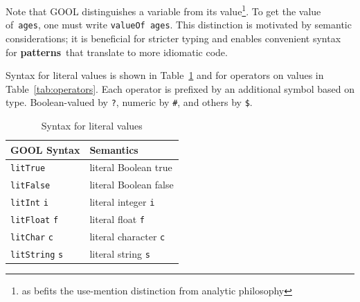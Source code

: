 \documentclass[sigplan,review,anonymous,prologue,dvipsnames]{acmart}
\newcommand{\abbrev}[1]{\textbf{#1}}
\newcommand{\oopatterns}{\abbrev{patterns}}
\begin{document}
Note that GOOL distinguishes a variable from its value\footnote{
as befits the use-mention distinction from analytic philosophy}. To get
the value of~\verb|ages|, one must write \verb|valueOf ages|. This distinction 
is motivated by semantic considerations; it is beneficial for stricter typing 
and enables convenient syntax for \oopatterns~that translate to more idiomatic
code.

Syntax for literal values is shown in Table~\ref{tab:literals} and for
operators on values in Table~\ref{tab:operators}. Each
operator is prefixed by an additional symbol based on type. 
Boolean-valued by \verb|?|, numeric by \verb|#|, and others by \verb|$|.

\begin{table}[ht]
  \caption{Syntax for literal values}
  \begin{tabular}{p{} p{}}
    \textbf{GOOL Syntax} & \textbf{Semantics} \\
    \midrule
    \verb|litTrue| & literal Boolean true \\
    \verb|litFalse| & literal Boolean false \\
    \verb|litInt| \verb|i| & literal integer \verb|i| \\
    \verb|litFloat| \verb|f| & literal float \verb|f| \\
    \verb|litChar| \verb|c| & literal character \verb|c| \\
    \verb|litString| \verb|s| & literal string \verb|s| \\
  \end{tabular}
  \label{tab:literals}
\end{table}
\end{document}
